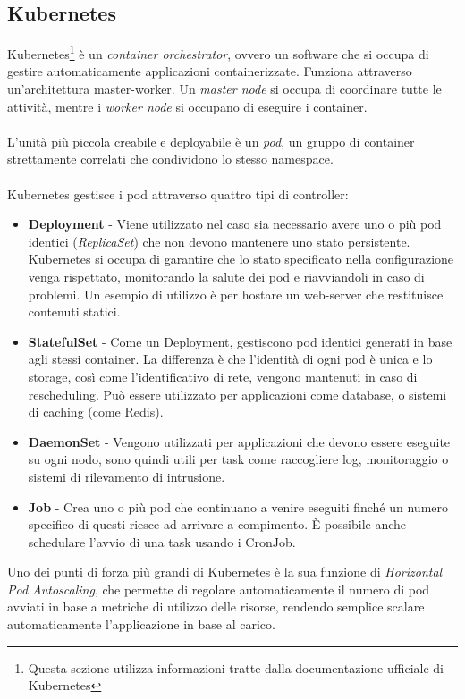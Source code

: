 \subsection{Kubernetes}
Kubernetes\footnote{Questa sezione utilizza informazioni tratte dalla documentazione ufficiale di Kubernetes\cite{kubernetesdocs}}
\`e un \textit{container orchestrator}, ovvero un software che si occupa di gestire automaticamente applicazioni containerizzate.
Funziona attraverso un'architettura master-worker. Un \textit{master node} si occupa di coordinare tutte le attivit\`a, mentre i \textit{worker node} si occupano di eseguire i container.
\\\\
L'unit\`a pi\`u piccola creabile e deployabile \`e un \textit{pod}, un gruppo di container strettamente correlati che condividono lo stesso namespace.
\\\\
Kubernetes gestisce i pod attraverso quattro tipi di controller:
\begin{itemize}
  \item \textbf{Deployment} - Viene utilizzato nel caso sia necessario avere uno o pi\`u pod identici (\textit{ReplicaSet}) che non devono mantenere uno stato persistente. Kubernetes si occupa
    di garantire che lo stato specificato nella configurazione venga rispettato, monitorando la salute dei pod e riavviandoli in caso di problemi.
    Un esempio di utilizzo \`e per hostare un web-server che restituisce contenuti statici.
  \item \textbf{StatefulSet} - Come un Deployment, gestiscono pod identici generati in base agli stessi container. La differenza \`e che l'identit\`a di ogni pod \`e unica e lo storage, cos\`i come l'identificativo di rete,
    vengono mantenuti in caso di rescheduling. Pu\`o essere utilizzato per applicazioni come database, o sistemi di caching (come Redis).
  \item \textbf{DaemonSet} - Vengono utilizzati per applicazioni che devono essere eseguite su ogni nodo, sono quindi utili per task come raccogliere log, monitoraggio o sistemi di rilevamento di intrusione.
  \item \textbf{Job} - Crea uno o pi\`u pod che continuano a venire eseguiti finch\'e un numero specifico di questi riesce ad arrivare a compimento. \`E possibile anche schedulare l'avvio di
    una task usando i CronJob.
\end{itemize}
Uno dei punti di forza pi\`u grandi di Kubernetes \`e la sua funzione di \textit{Horizontal Pod Autoscaling}, che permette di regolare automaticamente il numero di pod avviati in base a
metriche di utilizzo delle risorse, rendendo semplice scalare automaticamente l'applicazione in base al carico.
